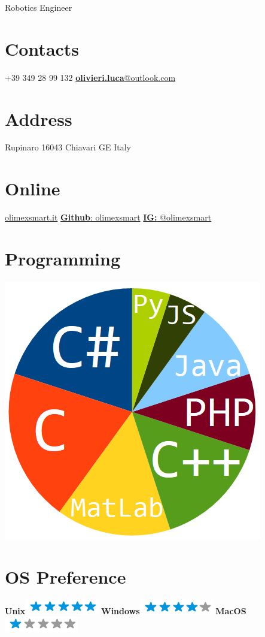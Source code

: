 \documentclass[]{friggeri-cv}
\begin{document}
      {Robotics Engineer}
      

\begin{aside}
  \section{Contacts}    
	+39 349 28 99 132
	\href{mailto:gliolivieri@live.it}{\textbf{olivieri.luca}@outlook.com}
	~	
  \section{Address}
  	Rupinaro
    16043 Chiavari GE
    Italy
    ~
  \section{Online}
    \href{http://www.olimexsmart.it}{olimexsmart.it}    
    \href{https://github.com/olimexsmart}{\textbf{Github}: olimexsmart}
    \href{https://www.instagram.com/olimexsmart/}{\textbf{IG: }@olimexsmart}
    ~
  \section{Programming}
    \includegraphics[scale=0.3]{img/progskilz.png}
    ~
  \section{OS Preference}
    \textbf{Unix}\includegraphics[scale=0.40]{img/5stars.png}
    \textbf{Windows}\includegraphics[scale=0.40]{img/4stars.png}
    \textbf{MacOS}\includegraphics[scale=0.40]{img/1stars.png}
    ~

\end{aside}
\end{document}
